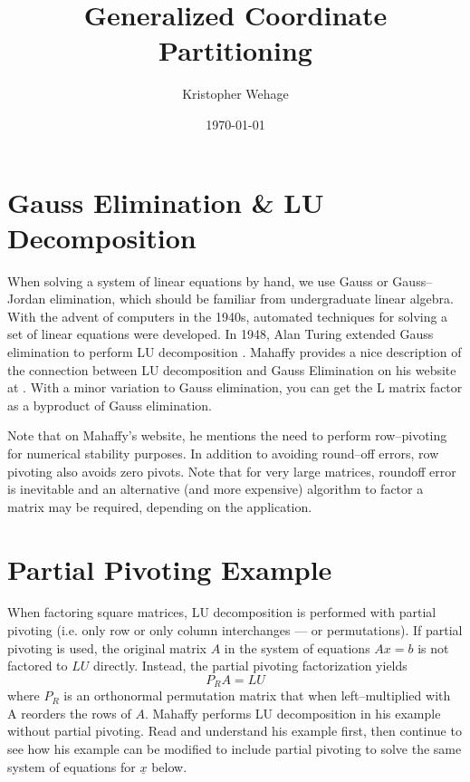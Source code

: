 \documentclass[12pt]{article}   %
\begin{document}
  
\title{Generalized Coordinate Partitioning}
\author{Kristopher Wehage}
\date{\today}
\maketitle

\section{Gauss Elimination \& LU Decomposition}
When solving a system of linear equations by hand, we use Gauss or Gauss--Jordan elimination, which should be familiar from undergraduate linear algebra. With the advent of computers in the 1940s, automated techniques for solving a set of linear equations were developed. In 1948, Alan Turing extended Gauss elimination to perform LU decomposition \cite{turing1948}. Mahaffy provides a nice description of the connection between LU decomposition and Gauss Elimination on his website at \cite{mahaffy_website}. With a minor variation to Gauss elimination, you can get the L matrix factor as a byproduct of Gauss elimination. 

Note that on Mahaffy's website, he mentions the need to perform row--pivoting for numerical stability purposes. In addition to avoiding round--off errors, row pivoting also avoids zero pivots. Note that for very large matrices, roundoff error is inevitable and an alternative (and more expensive) algorithm to factor a matrix may be required, depending on the application.

\section{Partial Pivoting Example}
When factoring square matrices, LU decomposition is performed with partial pivoting (i.e. only row or only column interchanges --- or permutations). If partial pivoting is used, the original matrix $A$ in the system of equations $Ax=b$ is not factored to $LU$ directly. Instead, the partial pivoting factorization yields 
\begin{equation}
P_RA=LU
\label{eq:PALU}
\end{equation}
where $P_R$ is an orthonormal permutation matrix that when left--multiplied with A reorders the rows of $A$. Mahaffy performs LU decomposition in his example without partial pivoting. Read and understand his example first, then continue to see how his example can be modified to include partial pivoting to solve the same system of equations for $\underline{x}$ below.
\end{document}
